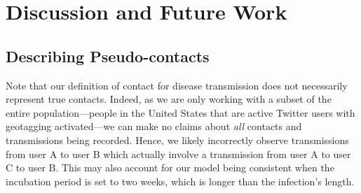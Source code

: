 






\section{Discussion and Future Work}

\subsection{Describing Pseudo-contacts}
\label{discussion:contacts}
Note that our definition of contact for disease transmission does not necessarily represent true contacts. Indeed, as we are only working with a subset of the entire population---people in the United States that are active Twitter users with geotagging activated---we can make no claims about \emph{all} contacts and transmissions being recorded. Hence, we likely incorrectly observe transmissions from user A to user B which actually involve a transmission from user A to user C to user B. This may also account for our model being consistent when the incubation period is set to two weeks, which is longer than the infection's length. \cite{thompson2004influenza}

